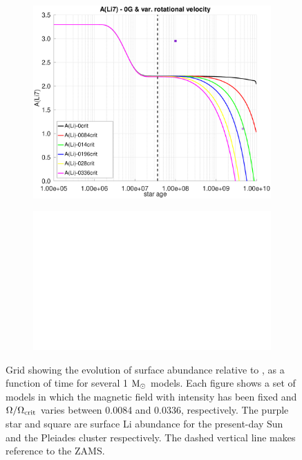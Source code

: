 \documentclass[fleqn,usenatbib]{mnras}
\begin{document}
\begin{ceqn}
\begin{figure}
\begin{subfigure}[h]{0.47\textwidth}
    \includegraphics[trim = 25mm 10mm 15mm 10mm, clip,width=\textwidth]{figures/paper1/li_var_vel_0_0g.eps}
    \label{fig:subim13}
    \end{subfigure}
    \begin{subfigure}[h]{0.47\textwidth}
    \includegraphics[width=\textwidth]{figures/blank.eps}
    \label{fig:subim14}
    \end{subfigure}

\caption{Grid showing the evolution of surface  abundance relative to , as a function of time for several 1 $\mathrm{M}_\odot$ models. Each figure shows a set of models in which the magnetic field with intensity has been fixed and $\Omega / \Omega_{\mathrm{crit}}$ varies between 0.0084 and 0.0336, respectively. The purple star and square are surface Li abundance for the present-day Sun \citep{Asplund2009} and the Pleiades cluster \citep{Sestito2005} respectively. The dashed vertical line makes reference to the ZAMS.}
\label{fig:grid_li_var_vel}
\end{figure}
\par



\end{ceqn}
\end{document}
